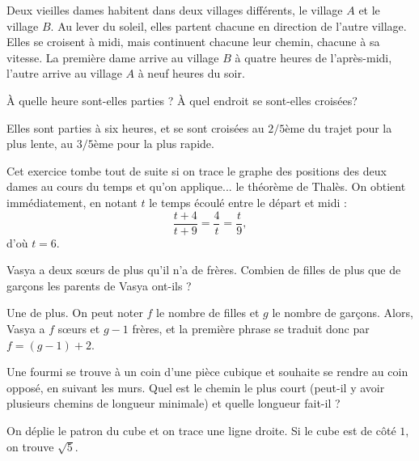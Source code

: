 \begin{exo}
Deux vieilles dames habitent dans deux villages différents, le village $A$ et le village $B$.
Au lever du soleil, elles partent chacune en direction de l'autre village. Elles se croisent à midi, mais continuent chacune leur chemin, chacune à sa vitesse. La première dame arrive au village $B$ à quatre heures de l'après-midi, l'autre arrive au village $A$ à neuf heures du soir.

À quelle heure sont-elles parties ? À quel endroit se sont-elles croisées?
\begin{sol}
Elles sont parties à six heures, et se sont croisées au $2/5$ème du trajet pour la plus lente, au $3/5$ème pour la plus rapide.

Cet exercice tombe tout de suite si on trace le graphe des positions des deux dames au cours du temps et qu'on applique... le théorème de Thalès. On obtient immédiatement, en notant $t$ le temps écoulé entre le départ et midi :
\[ \frac{t+4}{t+9} = \frac{4}{t} = \frac{t}{9},\]
d'où $t=6$.
\end{sol}
\end{exo}

\begin{exo}
Vasya a deux sœurs de plus qu'il n'a de frères. Combien de filles de plus que de garçons les parents de Vasya ont-ils ?
\begin{sol} Une de plus. On peut noter $f$ le nombre de filles et $g$ le nombre de garçons. Alors, Vasya a $f$ sœurs et $g-1$ frères, et la première phrase se traduit donc par $f = (g-1)+2$.
\end{sol}
\end{exo}






\begin{exo}[Fourmi]
Une fourmi se trouve à un coin d'une pièce cubique et souhaite se rendre au coin opposé, en suivant les murs. Quel est le chemin le plus court (peut-il y avoir plusieurs chemins de longueur minimale) et quelle longueur fait-il ?

\begin{sol}
On déplie le patron du cube et on trace une ligne droite. Si le cube est de côté $1$, on trouve $\sqrt 5$.
\end{sol}
\end{exo}


